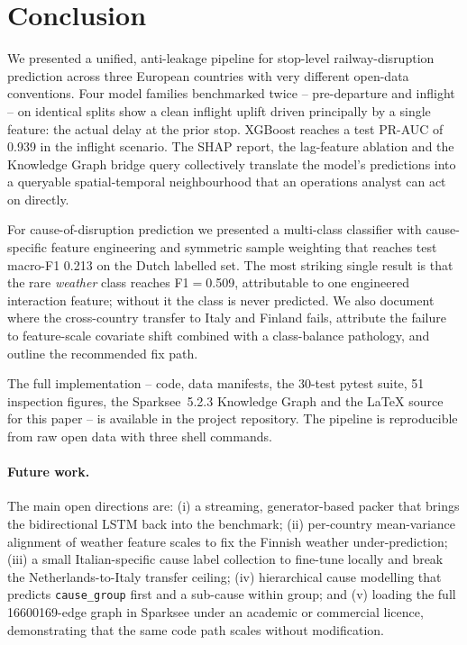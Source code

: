 \section{Conclusion}
\label{sec:conclusion}

We presented a unified, anti-leakage pipeline for stop-level railway-disruption prediction across three European countries with very different open-data conventions. Four model families benchmarked twice -- pre-departure and inflight -- on identical splits show a clean inflight uplift driven principally by a single feature: the actual delay at the prior stop. XGBoost reaches a test PR-AUC of \num{0.939} in the inflight scenario. The SHAP report, the lag-feature ablation and the Knowledge Graph bridge query collectively translate the model's predictions into a queryable spatial-temporal neighbourhood that an operations analyst can act on directly.

For cause-of-disruption prediction we presented a multi-class classifier with cause-specific feature engineering and symmetric sample weighting that reaches test macro-F1 \num{0.213} on the Dutch labelled set. The most striking single result is that the rare \emph{weather} class reaches F1$=$\num{0.509}, attributable to one engineered interaction feature; without it the class is never predicted. We also document where the cross-country transfer to Italy and Finland fails, attribute the failure to feature-scale covariate shift combined with a class-balance pathology, and outline the recommended fix path.

The full implementation -- code, data manifests, the 30-test pytest suite, 51 inspection figures, the Sparksee~5.2.3 Knowledge Graph and the LaTeX source for this paper -- is available in the project repository. The pipeline is reproducible from raw open data with three shell commands.

\paragraph{Future work.} The main open directions are: (i) a streaming, generator-based packer that brings the bidirectional LSTM back into the benchmark; (ii) per-country mean-variance alignment of weather feature scales to fix the Finnish weather under-prediction; (iii) a small Italian-specific cause label collection to fine-tune locally and break the Netherlands-to-Italy transfer ceiling; (iv) hierarchical cause modelling that predicts \texttt{cause\_group} first and a sub-cause within group; and (v) loading the full \num{16600169}-edge graph in Sparksee under an academic or commercial licence, demonstrating that the same code path scales without modification.
